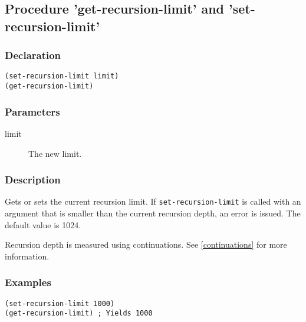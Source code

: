 \subsection{Procedure 'get-recursion-limit' and 'set-recursion-limit'}
\label{builtins/recursion-limit}

\subsubsection*{Declaration}
\begin{lstlisting}
(set-recursion-limit limit)
(get-recursion-limit)
\end{lstlisting}

\subsubsection*{Parameters}
\begin{description}
	\item[limit] The new limit.
\end{description}

\subsubsection*{Description}
Gets or sets the current recursion limit. If \lstinline|set-recursion-limit| is called with an argument that is smaller than the current recursion depth, an error is issued. The default value is 1024.

Recursion depth is measured using continuations. See \ref{continuations} for more information.

\subsubsection*{Examples}
\begin{lstlisting}
(set-recursion-limit 1000)
(get-recursion-limit) ; Yields 1000
\end{lstlisting}
